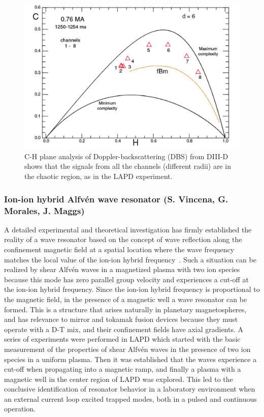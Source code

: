 \documentclass[11pt]{article}
\renewcommand{\cite}{\citep}
\begin{document}
\begin{figure}[!htbp]
\centerline{\includegraphics[width=3.8truein]{chaos2}}
\caption{C-H plane analysis of Doppler-backscattering (DBS) from DIII-D
shows that the signals from all the channels (different radii) are in
the chaotic region, as in the LAPD experiment.}\label{chaos}
\end{figure}


\subsubsection{Ion-ion hybrid Alfvén wave resonator (S. Vincena, G. Morales, J.
Maggs)}

A detailed experimental and theoretical investigation has firmly
established the reality of a wave resonator based on the concept of wave
reflection along the confinement magnetic field at a spatial location
where the wave frequency matches the local value of the ion-ion hybrid
frequency~\cite{vincena:2010,vincena:2011,farmer:2012,vincena:2013,farmer:2013}. Such a situation can be realized by shear Alfvén waves in a
magnetized plasma with two ion species because this mode has zero
parallel group velocity and experiences a cut-off at the ion-ion hybrid
frequency. Since the ion-ion hybrid frequency is proportional to the
magnetic field, in the presence of a magnetic well a wave resonator can
be formed. This is a structure that arises naturally in planetary
magnetospheres, and has relevance to mirror and tokamak fusion devices
because they must operate with a D-T mix, and their confinement fields
have axial gradients. A series of experiments were performed in LAPD
which started with the basic measurement of the properties of shear
Alfvén waves in the presence of two ion species in a uniform plasma.
Then it was established that the waves experience a cut-off when
propagating into a magnetic ramp, and finally a plasma with a magnetic
well in the center region of LAPD was explored. This led to the
conclusive identification of resonator behavior in a laboratory
environment when an external current loop excited trapped modes, both in
a pulsed and continuous operation.
\end{document}

